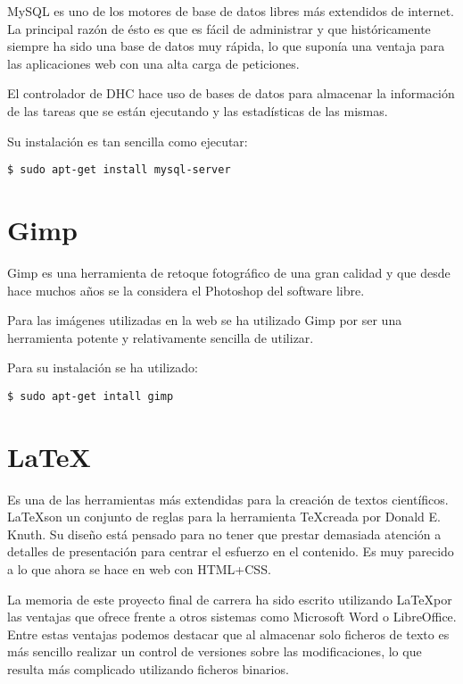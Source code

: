 MySQL es uno de los motores de base de datos libres más extendidos de internet. La principal razón de ésto es que es fácil de administrar y que históricamente siempre ha sido una base de datos muy rápida, lo que suponía una ventaja para las aplicaciones web con una alta carga de peticiones.

El controlador de DHC hace uso de bases de datos para almacenar la información de las tareas que se están ejecutando y las estadísticas de las mismas.

Su instalación es tan sencilla como ejecutar:

\begin{verbatim}
$ sudo apt-get install mysql-server
\end{verbatim}

\section{Gimp}

Gimp es una herramienta de retoque fotográfico de una gran calidad y que desde hace muchos años se la considera el Photoshop del software libre.

Para las imágenes utilizadas en la web se ha utilizado Gimp por ser una herramienta potente y relativamente sencilla de utilizar.

Para su instalación se ha utilizado:

\begin{verbatim}
$ sudo apt-get intall gimp
\end{verbatim}

\section{\LaTeX}

Es una de las herramientas más extendidas para la creación de textos científicos. \LaTeX son un conjunto de reglas para la herramienta \TeX creada por Donald E. Knuth. Su diseño está pensado para no tener que prestar demasiada atención a detalles de presentación para centrar el esfuerzo en el contenido. Es muy parecido a lo que ahora se hace en web con HTML+CSS.

La memoria de este proyecto final de carrera ha sido escrito utilizando \LaTeX por las ventajas que ofrece frente a otros sistemas como Microsoft Word o LibreOffice. Entre estas ventajas podemos destacar que al almacenar solo ficheros de texto es más sencillo realizar un control de versiones sobre las modificaciones, lo que resulta más complicado utilizando ficheros binarios.

